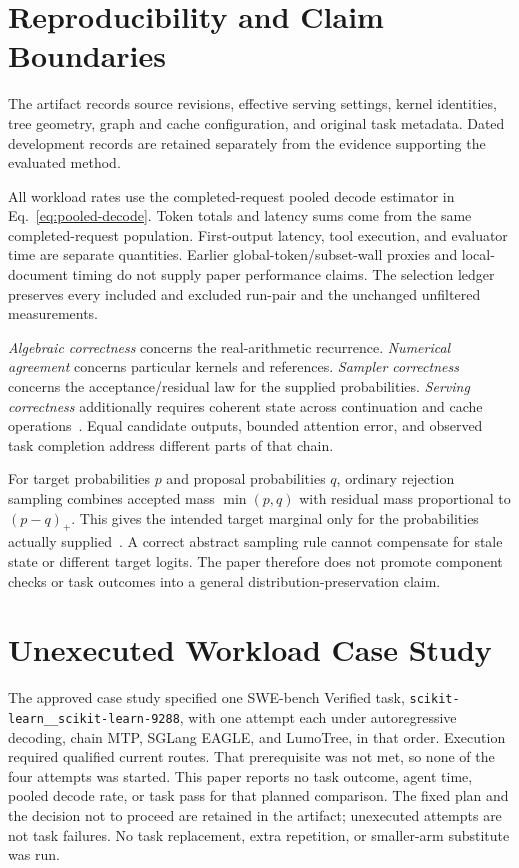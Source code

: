 \documentclass[conference]{IEEEtran}
\newcommand{\sys}{LumoTree}
\begin{document}
\appendices
\section{Reproducibility and Claim Boundaries}
\label{app:audit}
The artifact records source revisions, effective serving settings, kernel identities, tree geometry, graph and cache configuration, and original task metadata. Dated development records are retained separately from the evidence supporting the evaluated method.

All workload rates use the completed-request pooled decode estimator in Eq.~\ref{eq:pooled-decode}. Token totals and latency sums come from the same completed-request population. First-output latency, tool execution, and evaluator time are separate quantities. Earlier global-token/subset-wall proxies and local-document timing do not supply paper performance claims. The selection ledger preserves every included and excluded run-pair and the unchanged unfiltered measurements.

\textit{Algebraic correctness} concerns the real-arithmetic recurrence. \textit{Numerical agreement} concerns particular kernels and references. \textit{Sampler correctness} concerns the acceptance/residual law for the supplied probabilities. \textit{Serving correctness} additionally requires coherent state across continuation and cache operations~\cite{yang2024delta,chen2023sampling,lumo2026archive}. Equal candidate outputs, bounded attention error, and observed task completion address different parts of that chain.

For target probabilities $p$ and proposal probabilities $q$, ordinary rejection sampling combines accepted mass $\min(p,q)$ with residual mass proportional to $(p-q)_+$. This gives the intended target marginal only for the probabilities actually supplied~\cite{leviathan2023fast,chen2023sampling}. A correct abstract sampling rule cannot compensate for stale state or different target logits. The paper therefore does not promote component checks or task outcomes into a general distribution-preservation claim.

\section{Unexecuted Workload Case Study}
\label{app:validation}
The approved case study specified one SWE-bench Verified task, \texttt{scikit-learn\_\_scikit-learn-9288}, with one attempt each under autoregressive decoding, chain MTP, SGLang EAGLE, and \sys{}, in that order. Execution required qualified current routes. That prerequisite was not met, so none of the four attempts was started. This paper reports no task outcome, agent time, pooled decode rate, or task pass for that planned comparison. The fixed plan and the decision not to proceed are retained in the artifact; unexecuted attempts are not task failures. No task replacement, extra repetition, or smaller-arm substitute was run.
\end{document}

